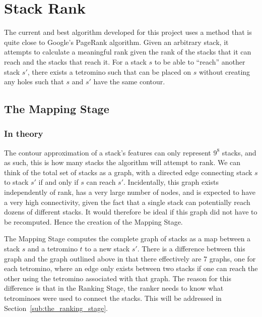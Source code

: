 \documentclass[fontsize=12pt]{article}
\begin{document}
\section{Stack Rank}
\label{sec:page_rank}

\par The current and best algorithm developed for this project uses a method that is quite close to Google's PageRank algorithm. Given an arbitrary stack, it attempts to calculate a meaningful rank given the rank of the stacks that it can reach and the stacks that reach it. For a stack $s$ to be able to ``reach'' another stack $s'$, there exists a tetromino such that can be placed on $s$ without creating any holes such that $s$ and $s'$ have the same contour.

\subsection{The Mapping Stage}
\label{sub:the_mapping_stage}

\subsubsection{In theory}
\label{ssub:in_theory}
\par The contour approximation of a stack's features can only represent $9^8$ stacks, and as such, this is how many stacks the algorithm will attempt to rank. We can think of the total set of stacks as a graph, with a directed edge connecting stack $s$ to stack $s'$ if and only if $s$ can reach $s'$. Incidentally, this graph exists independently of rank, has a very large number of nodes, and is expected to have a very high connectivity, given the fact that a single stack can potentially reach dozens of different stacks. It would therefore be ideal if this graph did not have to be recomputed. Hence the creation of the Mapping Stage.
\par The Mapping Stage computes the complete graph of stacks as a map between a stack $s$ and a tetromino $t$ to a new stack $s'$. There is a difference between this graph and the graph outlined above in that there effectively are 7 graphs, one for each tetromino, where an edge only exists between two stacks if one can reach the other using the tetromino associated with that graph. The reason for this difference is that in the Ranking Stage, the ranker needs to know what tetrominoes were used to connect the stacks. This will be addressed in Section~\ref{sub:the_ranking_stage}.
\end{document}
